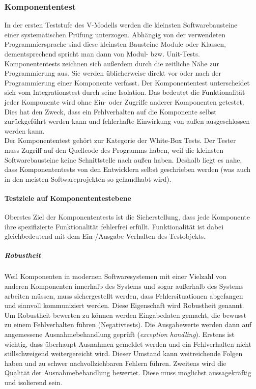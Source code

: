 \subsubsection{Komponententest}
In der ersten Teststufe des V-Modells werden die kleinsten Softwarebausteine einer systematischen Prüfung unterzogen. Abhängig von der verwendeten Programmiersprache sind diese kleinsten Bausteine Module oder Klassen, dementsprechend spricht man dann von Modul- bzw. Unit-Tests.\\
Komponententests zeichnen sich außerdem durch die zeitliche Nähe zur Programmierung aus. Sie werden üblicherweise direkt vor oder nach der Programmierung einer Komponente verfasst. Der Komponententest unterscheidet sich vom Integrationstest durch seine Isolation. Das bedeutet die Funktionalität jeder Komponente wird ohne Ein- oder Zugriffe anderer Komponenten getestet. Dies hat den Zweck, dass ein Fehlverhalten auf die Komponente selbst zurückgeführt werden kann und fehlerhafte Einwirkung von außen ausgeschlossen werden kann.\\
Der Komponententest gehört zur Kategorie der White-Box Tests. Der Tester muss Zugriff auf den Quellcode des Programms haben, weil die kleinsten Softwarebausteine keine Schnittstelle nach außen haben. Deshalb liegt es nahe, dass Komponententests von den Entwicklern selbst geschrieben werden (was auch in den meisten Softwareprojekten so gehandhabt wird).  

\paragraph{Testziele auf Komponententestebene}
Oberstes Ziel der Komponententests ist die Sicherstellung, dass jede Komponente ihre spezifizierte Funktionalität fehlerfrei erfüllt. Funktionalität ist dabei gleichbedeutend mit dem Ein-/Ausgabe-Verhalten des Testobjekts\cite{spillner_basiswissen_2012}.\\

\subparagraph{Robustheit} Weil Komponenten in modernen Softwaresystemen mit einer Vielzahl von anderen Komponenten innerhalb des Systems und sogar außerhalb des Systems arbeiten müssen, muss sichergestellt werden, dass Fehlersituationen abgefangen und sinnvoll kommuniziert werden. Diese Eigenschaft wird Robustheit genannt. Um Robustheit bewerten zu können werden Eingabedaten gemacht, die bewusst zu einem Fehlverhalten führen (Negativtests). Die Ausgabewerte werden dann auf angemessene Ausnahmebehandlung geprüft (\textit{exception handling}). Erstens ist wichtig, dass überhaupt Ausnahmen gemeldet werden und ein Fehlverhalten nicht stillschweigend weitergereicht wird. Dieser Umstand kann weitreichende Folgen haben und zu schwer nachvollziehbaren Fehlern führen. Zweitens wird die Qualität der Ausnahmebehandlung bewertet. Diese muss möglichst aussagekräftig und isolierend sein.

